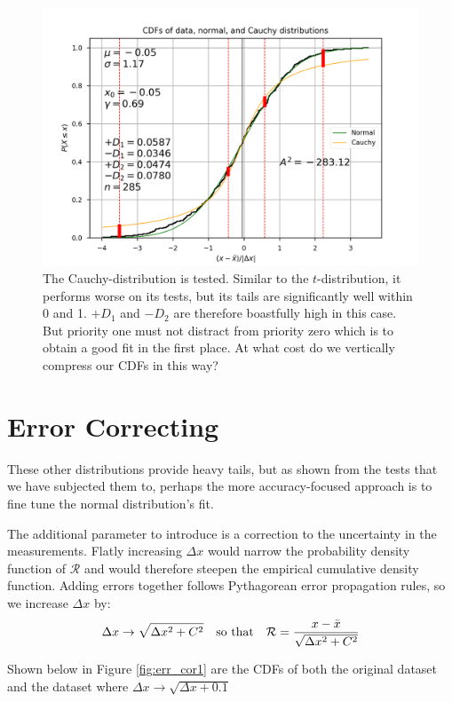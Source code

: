 \documentclass[12pt, a4paper]{article}
\begin{document}
\begin{figure}[H]
\centering
\includegraphics[width=\textwidth]{cauchy_cdf}
\caption{The Cauchy-distribution is tested.
  Similar to the $t$-distribution, it performs worse on its tests, but its tails are significantly well within 0 and 1.
  $+D_1$ and $-D_2$ are therefore boastfully high in this case.
  But priority one must not distract from priority zero which is to obtain a good fit in the first place.
  At what cost do we vertically compress our CDFs in this way?
}
\label{fig:cauchy_cdf}
\end{figure}


\section{Error Correcting}

These other distributions provide heavy tails, but as shown from the tests that we have subjected them to, perhaps the more accuracy-focused approach is to fine tune the normal distribution's fit.

The additional parameter to introduce is a correction to the uncertainty in the measurements.
Flatly increasing $\Delta x$ would narrow the probability density function of $\mathcal R$ and would therefore steepen the empirical cumulative density function.
Adding errors together follows Pythagorean error propagation rules, so we increase $\Delta x$ by:
\[
\Delta x \rightarrow \sqrt{\Delta x^2 + C^2}
\qq{so that}
\mathcal{R} = \frac{x-\bar x}{\sqrt{\Delta x^2 + C^2}}
\]

Shown below in Figure \ref{fig:err_cor1} are the CDFs of both the original dataset and the dataset where
$\Delta x \rightarrow \sqrt{\Delta x + 0.1}$
\end{document}
